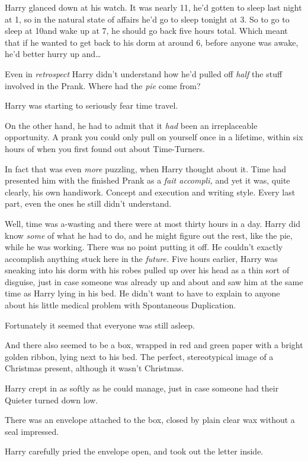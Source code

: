 Harry glanced down at his watch. It was nearly 11\AM, he'd gotten to sleep last
night at 1\AM, so in the natural state of affairs he'd go to sleep tonight at
3\AM. So to go to sleep at 10\PM and wake up at 7\AM, he should go back five hours
total. Which meant that if he wanted to get back to his dorm at around 6\AM,
before anyone was awake, he'd better hurry up and{\ldots}

Even in \emph{retrospect} Harry didn't understand how he'd pulled off
\emph{half} the stuff involved in the Prank. Where had the \emph{pie} come from?

Harry was starting to seriously fear time travel.

On the other hand, he had to admit that it \emph{had} been an irreplaceable
opportunity. A prank you could only pull on yourself once in a lifetime, within
six hours of when you first found out about Time-Turners.

In fact that was even \emph{more} puzzling, when Harry thought about it. Time
had presented him with the finished Prank as a \emph{fait accompli,} and yet it
was, quite clearly, his own handiwork. Concept and execution and writing style.
Every last part, even the ones he still didn't understand.

Well, time was a-wasting and there were at most thirty hours in a day. Harry
did know \emph{some} of what he had to do, and he might figure out the rest,
like the pie, while he was working. There was no point putting it off. He
couldn't exactly accomplish anything stuck here in the \emph{future.}
\sbreak
Five hours earlier, Harry was sneaking into his dorm with his robes pulled up
over his head as a thin sort of disguise, just in case someone was already up
and about and saw him at the same time as Harry lying in his bed. He didn't
want to have to explain to anyone about his little medical problem with
Spontaneous Duplication.

Fortunately it seemed that everyone was still asleep.

And there also seemed to be a box, wrapped in red and green paper with a bright
golden ribbon, lying next to his bed. The perfect, stereotypical image of a
Christmas present, although it wasn't Christmas.

Harry crept in as softly as he could manage, just in case someone had their
Quieter turned down low.

There was an envelope attached to the box, closed by plain clear wax without a
seal impressed.

Harry carefully pried the envelope open, and took out the letter inside.

